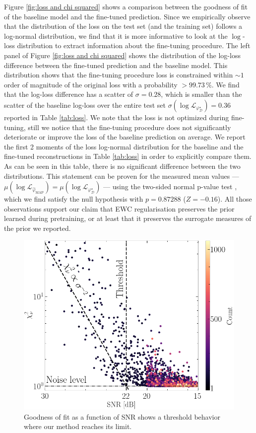 Figure \ref{fig:loss and chi squared} shows a comparison between 
the goodness of fit of the baseline model and the fine-tuned prediction. 
Since we empirically observe that the distribution of the loss on the test set (and the training set) follows a log-normal distribution, we find that it is more informative to look at the $\log$-loss 
distribution to extract information about the fine-tuning procedure. 
The left panel of Figure \ref{fig:loss and chi squared} 
shows the distribution of the log-loss difference between the fine-tuned prediction and the baseline model. This distribution shows that the fine-tuning procedure loss is constrained within $\sim 1$ order of magnitude of the original loss with a probability $>99.73\,\%$. We find that the log-loss difference has a scatter of $\sigma = 0.28$, which is smaller than the scatter of the baseline log-loss over the entire test set $\sigma(\log \mathcal{L}_{\varphi^\star_{\mathcal{D}}}) = 0.36$ reported in Table \ref{tab:loss}.
We note that the loss is not optimized during fine-tuning, still we notice that the fine-tuning procedure does not significantly deteriorate or improve the loss of the baseline prediction on average. We report the first 2 moments of the loss log-normal distribution for the baseline and the fine-tuned reconstructions in Table \ref{tab:loss} in order to explicitly compare them. As can be seen in this table, there is no significant difference between the two distributions. This statement can be proven for the measured mean values --- $\mu(\log \mathcal{L}_{\hat{\varphi}_{\mathrm{MAP}}}) = \mu(\log \mathcal{L}_{\varphi^{\star}_{\mathcal{D}}}) $ --- using the two-sided normal p-value test \citep{Casella2001}, which we find satisfy the null hypothesis with $p=0.87288$ ($Z = -0.16$). All those observations support our claim that EWC regularisation preserves the prior learned during pretraining, or at least that it preserves the surrogate measures of the prior we reported. 

\begin{figure}[H]
        \centering
        \includegraphics[width=0.6\linewidth]{figures/chisq_vs_noise_ewc}
        \caption{Goodness of fit as a function of SNR shows a threshold 
        behavior where our method reaches its limit.}
        \label{fig:chi squared vs noise}
\end{figure}



